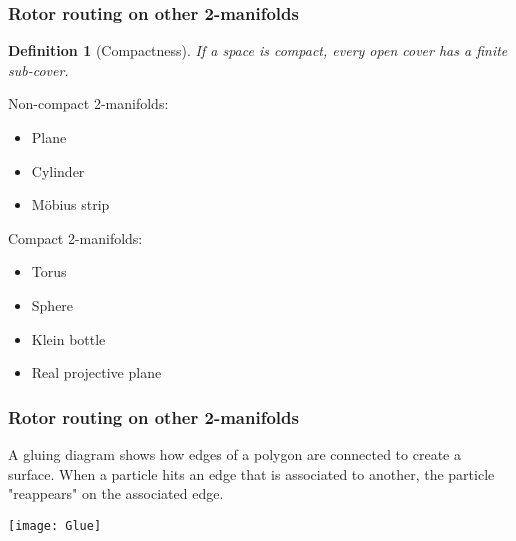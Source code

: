 \documentclass{beamer}
\newtheorem{defn}{Definition}
\begin{document}
\begin{frame}
	\frametitle{Rotor routing on other 2-manifolds}
	
	\begin{defn}[Compactness]
		If a space is compact, every open cover has a finite sub-cover.
	\end{defn}
	
	\pause
	
	\begin{multicols}{2}
		Non-compact 2-manifolds:
		\begin{itemize}
			\item Plane
			\item Cylinder
			\item M{\"o}bius strip
		\end{itemize}
		
		\pause
	
		\hspace{2cm}
	
		Compact 2-manifolds:
		\begin{itemize}
			\item Torus
			\item Sphere
			\item Klein bottle
			\item Real projective plane
		\end{itemize}
	\end{multicols}
	
\end{frame}


\begin{frame}
	\frametitle{Rotor routing on other 2-manifolds}
	
	A gluing diagram shows how edges of a polygon are connected to create a surface. When a particle hits an edge that is associated to another, the particle "reappears" on the associated edge.
	\vspace{-0.5cm}
	\begin{center}
		\texttt{[image: Glue]}
	\end{center}

\end{frame}
\end{document}
